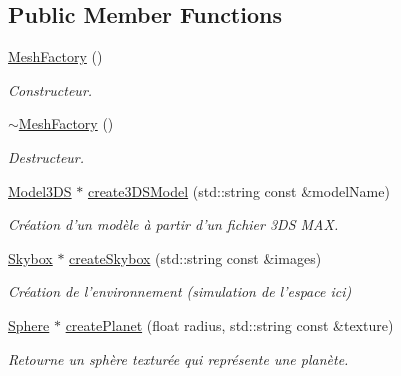 \subsection*{Public Member Functions}
\begin{DoxyCompactItemize}
\item 
\hypertarget{classMeshFactory_a4e7e1572a5d2ce108b5e2c53b58499d2}{\hyperlink{classMeshFactory_a4e7e1572a5d2ce108b5e2c53b58499d2}{Mesh\+Factory} ()}\label{classMeshFactory_a4e7e1572a5d2ce108b5e2c53b58499d2}

\begin{DoxyCompactList}\small\item\em Constructeur. \end{DoxyCompactList}\item 
\hypertarget{classMeshFactory_a642f0dc431ea97f93d3e1cea6df64b8e}{\hyperlink{classMeshFactory_a642f0dc431ea97f93d3e1cea6df64b8e}{$\sim$\+Mesh\+Factory} ()}\label{classMeshFactory_a642f0dc431ea97f93d3e1cea6df64b8e}

\begin{DoxyCompactList}\small\item\em Destructeur. \end{DoxyCompactList}\item 
\hypertarget{classMeshFactory_aed116b3fd378392baa10bae536a83ed4}{\hyperlink{classModel3DS}{Model3\+D\+S} $\ast$ \hyperlink{classMeshFactory_aed116b3fd378392baa10bae536a83ed4}{create3\+D\+S\+Model} (std\+::string const \&model\+Name)}\label{classMeshFactory_aed116b3fd378392baa10bae536a83ed4}

\begin{DoxyCompactList}\small\item\em Création d'un modèle à partir d'un fichier 3\+D\+S M\+A\+X. \end{DoxyCompactList}\item 
\hypertarget{classMeshFactory_a5e35b9f6089ea14c6c9ad88a8ba6f66e}{\hyperlink{classSkybox}{Skybox} $\ast$ \hyperlink{classMeshFactory_a5e35b9f6089ea14c6c9ad88a8ba6f66e}{create\+Skybox} (std\+::string const \&images)}\label{classMeshFactory_a5e35b9f6089ea14c6c9ad88a8ba6f66e}

\begin{DoxyCompactList}\small\item\em Création de l'environnement (simulation de l'espace ici) \end{DoxyCompactList}\item 
\hypertarget{classMeshFactory_a25c338f855f27bd73bbc7bd7b6a1bf7b}{\hyperlink{classSphere}{Sphere} $\ast$ \hyperlink{classMeshFactory_a25c338f855f27bd73bbc7bd7b6a1bf7b}{create\+Planet} (float radius, std\+::string const \&texture)}\label{classMeshFactory_a25c338f855f27bd73bbc7bd7b6a1bf7b}

\begin{DoxyCompactList}\small\item\em Retourne un sphère texturée qui représente une planète. \end{DoxyCompactList}\end{DoxyCompactItemize}
